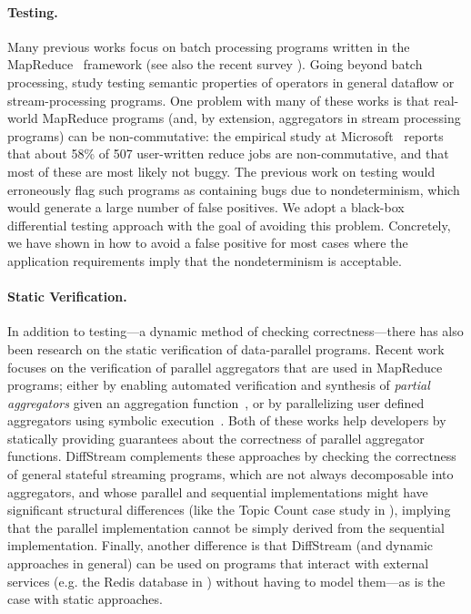 \paragraph{Testing.}
Many previous works focus on batch processing programs written in the MapReduce~\cite{MapReduce2008} framework \cite{csallner2011new,xu2013semantic,marynowski2012testing,chen2016commutativity} (see also the recent survey \cite{moran2019testing}). Going beyond batch processing, \cite{xu2013testing} study testing semantic properties of operators in general dataflow or stream-processing programs.
One problem with many of these works \cite{csallner2011new,xu2013semantic,xu2013testing,chen2016commutativity} is that real-world MapReduce programs (and, by extension, aggregators in stream processing programs) can be non-commutative: the empirical study at Microsoft~\cite{xiao2014nondeterminism} reports that about 58\% of 507 user-written reduce jobs are non-commutative, and that most of these are most likely not buggy. The previous work on testing would erroneously flag such programs as containing bugs due to nondeterminism, which would generate a large number of false positives.
We adopt a black-box differential testing approach with the goal of avoiding this problem. Concretely, we have shown in  how to avoid a false positive for most cases where the application requirements imply that the nondeterminism is acceptable.

\paragraph{Static Verification.}
%
In addition to testing---a dynamic method of checking
correctness---there has also been research on the static verification
of data-parallel programs. Recent work focuses on the verification of
parallel aggregators that are used in MapReduce programs; either by
enabling automated verification and synthesis of \emph{partial
aggregators} given an aggregation function~\cite{liu2014automating},
or by parallelizing user defined aggregators using symbolic
execution~\cite{raychev2015parallelizing}. Both of these works help
developers by statically providing guarantees about the correctness of
parallel aggregator functions. DiffStream complements these approaches
by checking the correctness of general stateful streaming programs,
which are not always decomposable into aggregators, and whose parallel
and sequential implementations might have significant structural
differences (like the Topic Count case study in
), implying that the parallel implementation cannot be simply
derived from the sequential implementation. Finally, another
difference is that DiffStream (and dynamic approaches in general) can be
used on programs that interact with external services (e.g. the Redis
database in ) without having to model
them---as is the case with static approaches.

